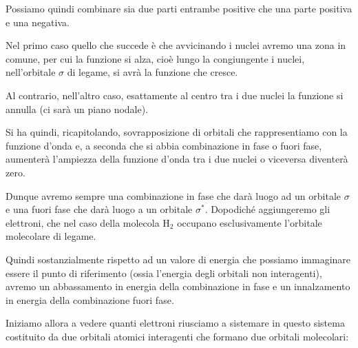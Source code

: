 Possiamo quindi combinare sia due parti entrambe positive che una parte positiva e una negativa.

Nel primo caso quello che succede è che avvicinando i nuclei avremo una zona in comune, per cui la funzione si alza, cioè lungo la congiungente i nuclei, nell'orbitale $\sigma$ di legame, si avrà la funzione che cresce.

Al contrario, nell'altro caso, esattamente al centro tra i due nuclei la funzione si annulla (ci sarà un piano nodale).

Si ha quindi, ricapitolando, sovrapposizione di orbitali che rappresentiamo con la funzione d'onda e, a seconda che si abbia combinazione in fase o fuori fase, aumenterà l'ampiezza della funzione d'onda tra i due nuclei o viceversa diventerà zero.

Dunque avremo sempre una combinazione in fase che darà luogo ad un orbitale $\sigma$ e una fuori fase che darà luogo a un orbitale $\sigma^*$. Dopodiché aggiungeremo gli elettroni, che nel caso della molecola H$_2$ occupano esclusivamente l'orbitale molecolare di legame.

Quindi sostanzialmente rispetto ad un valore di energia che possiamo immaginare essere il punto di riferimento (ossia l'energia degli orbitali non interagenti), avremo un abbassamento in energia della combinazione in fase e un innalzamento in energia della combinazione fuori fase.

\vspace{0.2cm}Iniziamo allora a vedere quanti elettroni riusciamo a sistemare in questo sistema costituito da due orbitali atomici interagenti che formano due orbitali molecolari:

